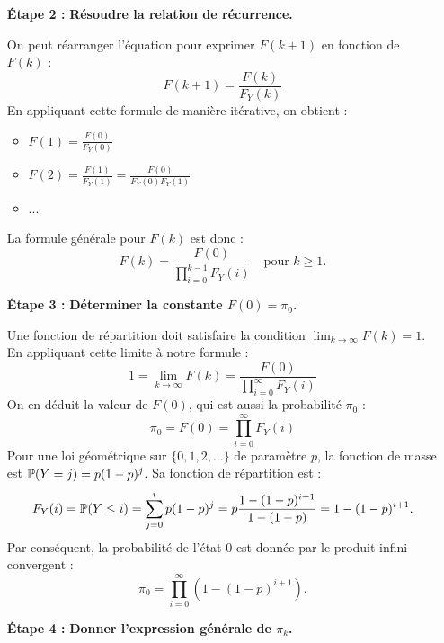 \documentclass[solutions]{exercices}
\begin{document}
\begin{solution}
\begin{enumerate}
\begin{enumerate}
			      \item[\textbf{Étape 2 :}] \textbf{Résoudre la relation de récurrence.}

			            On peut réarranger l'équation pour exprimer $F(k+1)$ en fonction de $F(k)$ :
			            \[
				            F(k+1) = \frac{F(k)}{F_Y(k)}
			            \]
			            En appliquant cette formule de manière itérative, on obtient :
			            \begin{itemize}
				            \item $F(1) = \frac{F(0)}{F_Y(0)}$
				            \item $F(2) = \frac{F(1)}{F_Y(1)} = \frac{F(0)}{F_Y(0)F_Y(1)}$
				            \item ...
			            \end{itemize}
			            La formule générale pour $F(k)$ est donc :
			            \[
				            F(k) = \frac{F(0)}{\prod_{i=0}^{k-1} F_Y(i)} \quad \text{pour } k \ge 1.
			            \]

			      \item[\textbf{Étape 3 :}] \textbf{Déterminer la constante $F(0) = \pi_0$.}

			            Une fonction de répartition doit satisfaire la condition $\lim_{k \to \infty} F(k) = 1$. En appliquant cette limite à notre formule :
			            \[
				            1 = \lim_{k \to \infty} F(k) = \frac{F(0)}{\prod_{i=0}^{\infty} F_Y(i)}
			            \]
			            On en déduit la valeur de $F(0)$, qui est aussi la probabilité $\pi_0$ :
			            \[
				            \pi_0 = F(0) = \prod_{i=0}^{\infty} F_Y(i)
			            \]
			            Pour une loi géométrique sur $\{0, 1, 2, \dots\}$ de paramètre $p$, la fonction de masse est $\P(Y=j) = p(1-p)^j$. Sa fonction de répartition est :
			            \[
				            F_Y(i) = \P(Y \le i) = \sum_{j=0}^{i} p(1-p)^j = p \frac{1 - (1-p)^{i+1}}{1 - (1-p)} = 1 - (1-p)^{i+1}.
			            \]
			            Par conséquent, la probabilité de l'état 0 est donnée par le produit infini convergent :
			            \[
				            \pi_0 = \prod_{i=0}^{\infty} \left(1 - (1-p)^{i+1}\right).
			            \]

			      \item[\textbf{Étape 4 :}] \textbf{Donner l'expression générale de $\pi_k$.}


\end{enumerate}
\end{enumerate}
\end{solution}
\end{document}
